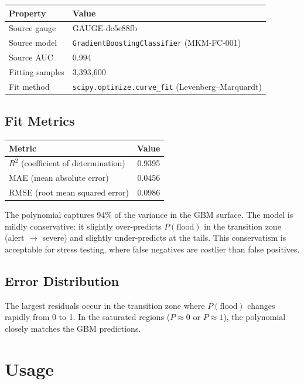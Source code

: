 \documentclass[11pt,a4paper]{article}
\begin{document}
\begin{center}
\begin{tabular}{ll}
\toprule
\textbf{Property} & \textbf{Value} \\
\midrule
Source gauge & GAUGE-dc5e88fb \\
Source model & \texttt{GradientBoostingClassifier} (MKM-FC-001) \\
Source AUC & 0.994 \\
Fitting samples & 3,393,600 \\
Fit method & \texttt{scipy.optimize.curve\_fit} (Levenberg--Marquardt) \\
\bottomrule
\end{tabular}
\end{center}

\subsection{Fit Metrics}
\begin{center}
\begin{tabular}{lr}
\toprule
\textbf{Metric} & \textbf{Value} \\
\midrule
$R^2$ (coefficient of determination) & 0.9395 \\
MAE (mean absolute error) & 0.0456 \\
RMSE (root mean squared error) & 0.0986 \\
\bottomrule
\end{tabular}
\end{center}

\noindent The polynomial captures 94\% of the variance in the GBM surface. The
model is mildly conservative: it slightly over-predicts $P(\text{flood})$ in the
transition zone (alert $\to$ severe) and slightly under-predicts at the tails.
This conservatism is acceptable for stress testing, where false negatives are
costlier than false positives.

\subsection{Error Distribution}
The largest residuals occur in the transition zone where $P(\text{flood})$
changes rapidly from 0 to 1. In the saturated regions ($P \approx 0$ or
$P \approx 1$), the polynomial closely matches the GBM predictions.

\section{Usage}
\end{document}
